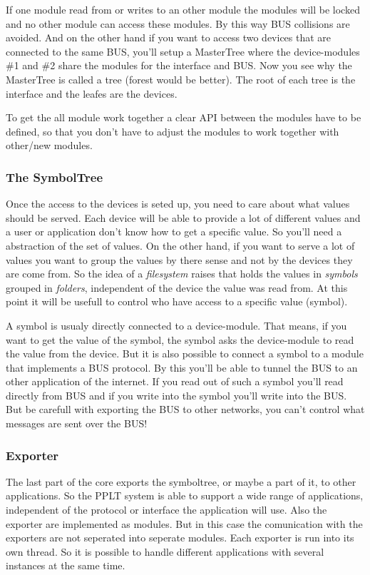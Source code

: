 If one module read from or writes to an other module the modules
will be locked and no other module can access these modules. By this way 
BUS collisions are avoided. And on the other hand if you want to access
two devices that are connected to the same BUS, you'll setup a 
MasterTree where the device-modules \#1 and \#2 share the modules for the 
interface and BUS. Now you see why the MasterTree is called a tree (forest 
would be better). The root of each tree is the interface and the leafes are 
the devices.

To get the all module work together a clear API between the modules have
to be defined, so that you don't have to adjust the modules to work together
with other/new modules. 

\subsubsection{The SymbolTree}
Once the access to the devices is seted up, you need to care about what values 
should be served. Each device will be able to provide a lot of different values
and a user or application don't know how to get a specific value. So you'll 
need a abstraction of the set of values. On the other hand, if you want to 
serve a lot of values you want to group the values by there sense and not by the
devices they are come from. So the idea of a \textit{filesystem} raises that holds 
the values in \textit{symbols} grouped in \textit{folders}, independent of the 
device the value was read from. At this point it will be usefull to control
who have access to a specific value (symbol). 

A symbol is usualy directly connected to a device-module. That means, if you 
want to get the value of the symbol, the symbol asks the device-module to read
the value from the device. But it is also possible to connect a symbol to a
module that implements a BUS protocol. By this you'll be able to tunnel the 
BUS to an other application of the internet. If you read out of such a symbol
you'll read directly from BUS and if you write into the symbol you'll write 
into the BUS. But be carefull with exporting the BUS to other networks, you
can't control what messages are sent over the BUS!

\subsubsection{Exporter}
The last part of the core exports the symboltree, or maybe a part of it, to
other applications. So the PPLT system is able to support a wide range of 
applications, independent of the protocol or interface the application
will use. Also the exporter are implemented as modules. But in this case
the comunication with the exporters are not seperated into seperate modules.
Each exporter is run into its own thread. So it is possible to handle
different applications with several instances at the same time. 


